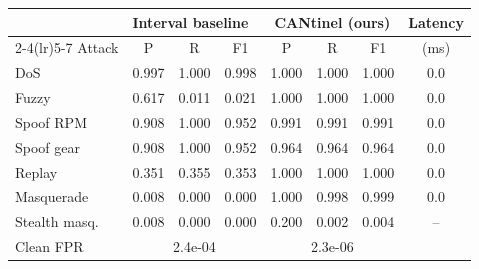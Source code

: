 \begin{tabular}{@{}lccccccc@{}}
\toprule
 & \multicolumn{3}{c}{Interval baseline~\cite{song2016}} & \multicolumn{3}{c}{CANtinel (ours)} & Latency\\
\cmidrule(lr){2-4}\cmidrule(lr){5-7}
Attack & P & R & F1 & P & R & F1 & (ms)\\
\midrule
DoS & 0.997 & 1.000 & 0.998 & 1.000 & 1.000 & 1.000 & 0.0\\
Fuzzy & 0.617 & 0.011 & 0.021 & 1.000 & 1.000 & 1.000 & 0.0\\
Spoof RPM & 0.908 & 1.000 & 0.952 & 0.991 & 0.991 & 0.991 & 0.0\\
Spoof gear & 0.908 & 1.000 & 0.952 & 0.964 & 0.964 & 0.964 & 0.0\\
Replay & 0.351 & 0.355 & 0.353 & 1.000 & 1.000 & 1.000 & 0.0\\
Masquerade & 0.008 & 0.000 & 0.000 & 1.000 & 0.998 & 0.999 & 0.0\\
Stealth masq. & 0.008 & 0.000 & 0.000 & 0.200 & 0.002 & 0.004 & --\\
\midrule
Clean FPR & \multicolumn{3}{c}{2.4e-04} & \multicolumn{3}{c}{2.3e-06} & \\
\bottomrule
\end{tabular}
